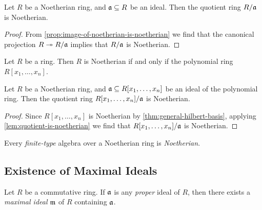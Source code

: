 \begin{lemma}
\label{lem:quotient-is-noetherian}
Let \(R\) be a Noetherian ring, and \(\mathfrak{a} \subseteq R\) be an ideal. Then
the quotient ring \(R/\mathfrak{a}\) is Noetherian.
\end{lemma}

\begin{proof}
From \cref{prop:image-of-noetherian-is-noetherian} we find that the canonical
projection \(R \twoheadrightarrow R/\mathfrak{a}\) implies that \(R/\mathfrak{a}\) is Noetherian.
\end{proof}

\begin{theorem}
\label{thm:general-hilbert-basis}
Let \(R\) be a ring. Then \(R\) is Noetherian if and only if the polynomial ring
\(R[x_1, \dots, x_n]\).
\end{theorem}


\begin{corollary}
\label{cor:noetherian-quotient-poly-ring}
Let \(R\) be a Noetherian ring, and \(\mathfrak{a} \subseteq R[x_1, \dots, x_n]\)
be an ideal of the polynomial ring. Then the quotient ring
\(R[x_1, \dots, x_n]/\mathfrak{a}\) is Noetherian.
\end{corollary}

\begin{proof}
Since \(R[x_1, \dots, x_n]\) is Noetherian by \cref{thm:general-hilbert-basis},
applying \cref{lem:quotient-is-noetherian} we find that \(R[x_1, \dots,
x_n]/\mathfrak{a}\) is Noetherian.
\end{proof}

\begin{corollary}
\label{cor:finite-type-alg-noetherian}
Every \emph{finite-type} algebra over a Noetherian ring is \emph{Noetherian}.
\end{corollary}

\subsection{Existence of Maximal Ideals}

\begin{proposition}
\label{prop:commutative-rings-have-maximal-ideals}
Let \(R\) be a commutative ring. If \(\mathfrak{a}\) is any \emph{proper} ideal of
\(R\), then there exists a \emph{maximal ideal} \(\mathfrak{m}\) of \(R\) containing
\(\mathfrak{a}\).
\end{proposition}

